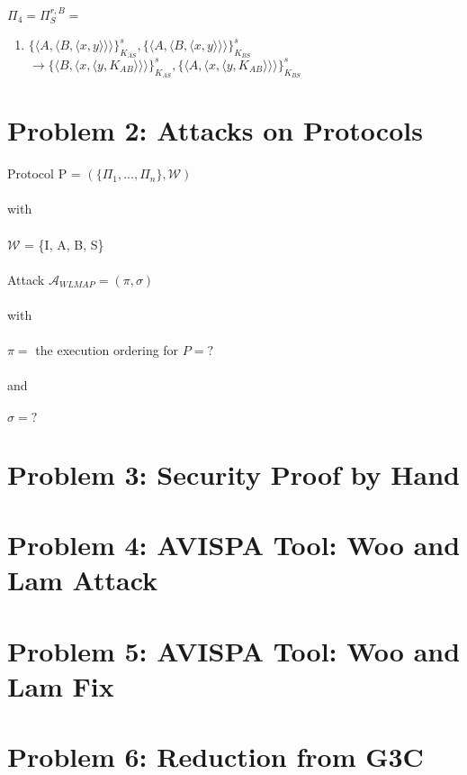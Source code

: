 \documentclass[12pt,pdftex,a4paper]{article}
\newcommand\tab[1][1cm]{\hspace*{#1}}
\begin{document}
$\Pi_4 = \Pi_S^{r,B} =$
\begin{enumerate}
\item \tab $ \{\langle A, \langle B, \langle x, y\rangle\rangle\rangle\}_{K_{AS}}^s, \{\langle A, \langle B, \langle x, y\rangle\rangle\rangle\}_{K_{BS}}^s $ \\ \tab $\rightarrow \{\langle B, \langle x, \langle y, K_{AB}\rangle\rangle\rangle\}_{K_{AS}}^s,\{\langle A, \langle x, \langle y, K_{AB}\rangle\rangle\rangle\}_{K_{BS}}^s $
\end{enumerate}

\section*{Problem 2: Attacks on Protocols}
Protocol P = $(\{\Pi_1, ..., \Pi_n\}, \mathcal{W})$ \\~\\
with\\~\\
$\mathcal{W}$ = \{I, A, B, S\}\\~\\

Attack $\mathcal{A}_{WLMAP} = (\pi, \sigma) $ \\~\\
with\\~\\
$\pi = $ the execution ordering for $ P = ? $ \\~\\
and \\~\\
$\sigma =? $


\section*{Problem 3: Security Proof by Hand}

\section*{Problem 4: AVISPA Tool: Woo and Lam Attack}

\section*{Problem 5: AVISPA Tool: Woo and Lam Fix}

\section*{Problem 6: Reduction from G3C}
\end{document}
